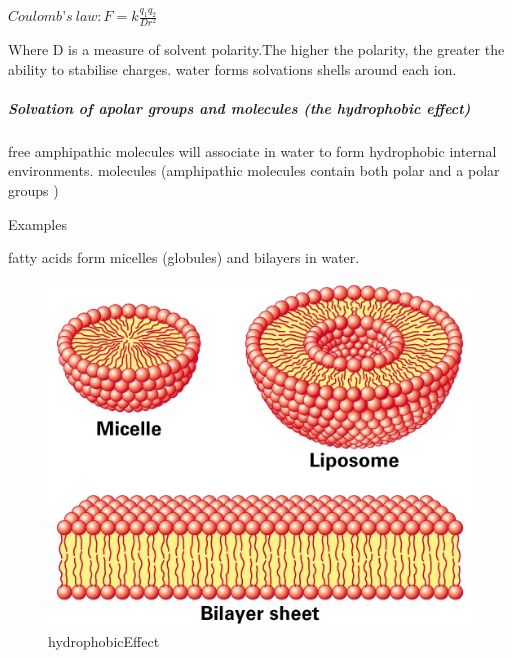 \documentclass[]{article}
\let\oldsubparagraph\subparagraph
\renewcommand{\subparagraph}[1]{\oldsubparagraph{#1}\mbox{}}
\begin{document}
\(Coulomb’s\ law: F = k\frac{ q_{1}q_{2}}{ Dr^{2}}\)

Where D is a measure of solvent polarity.The higher the polarity, the
greater the ability to stabilise charges. water forms solvations shells
around each ion.

\hypertarget{solvation-of-apolar-groups-and-molecules-the-hydrophobic-effect}{%
\subparagraph{Solvation of apolar groups and molecules (the hydrophobic
effect)}\label{solvation-of-apolar-groups-and-molecules-the-hydrophobic-effect}}

free amphipathic molecules will associate in water to form hydrophobic
internal environments. molecules (amphipathic molecules contain both
polar and a polar groups )

Examples

fatty acids form micelles (globules) and bilayers in water.

\begin{figure}
\centering
\includegraphics{Images/FattyAcidsInWater.JPG}
\caption{hydrophobicEffect}
\end{figure}
\end{document}

